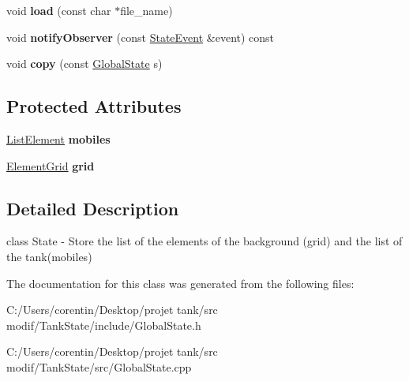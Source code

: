\begin{DoxyCompactItemize}
void {\bfseries load} (const char $\ast$file\+\_\+name)
\item 
\mbox{\label{classstate_1_1_global_state_a91c7898318ef25c9a3481a9863fd9c21}} 
void {\bfseries notify\+Observer} (const \hyperlink{classstate_1_1_state_event}{State\+Event} \&event) const
\item 
\mbox{\label{classstate_1_1_global_state_abd600cd6bf17f0f2046d8af0c604b35f}} 
void {\bfseries copy} (const \hyperlink{classstate_1_1_global_state}{Global\+State} s)
\end{DoxyCompactItemize}
\subsection*{Protected Attributes}
\begin{DoxyCompactItemize}
\item 
\mbox{\label{classstate_1_1_global_state_a483c8cbfeb541e31b6aa486eb994b74f}} 
\hyperlink{classstate_1_1_list_element}{List\+Element} {\bfseries mobiles}
\item 
\mbox{\label{classstate_1_1_global_state_a637c91d09cfc38a64ef28ce79c2a8927}} 
\hyperlink{classstate_1_1_element_grid}{Element\+Grid} {\bfseries grid}
\end{DoxyCompactItemize}


\subsection{Detailed Description}
class State -\/ Store the list of the elements of the background (grid) and the list of the tank(mobiles) 

The documentation for this class was generated from the following files\+:\begin{DoxyCompactItemize}
\item 
C\+:/\+Users/corentin/\+Desktop/projet tank/src modif/\+Tank\+State/include/Global\+State.\+h\item 
C\+:/\+Users/corentin/\+Desktop/projet tank/src modif/\+Tank\+State/src/Global\+State.\+cpp\end{DoxyCompactItemize}
